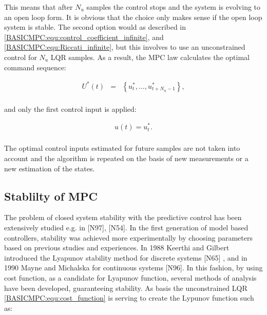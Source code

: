		This means that after $N_u$ samples the control stops and the system is evolving to an open loop form. It is obvious that the choice only makes sense if the open loop system is stable. The second option would as described in \ref{BASICMPC:equ:control_coefficient_infinite}, and \ref{BASICMPC:equ:Riccati_infinite}, but this involves to use an unconstrained control for $N_u$ LQR samples. As a result, the MPC law calculates the optimal command sequence:
		
		\begin{equation}
        \begin{array}{rcl}
				U^*(t)&=&\left\{u^*_t,\dots,u^*_{t+N_u-1}\right\},\\
        \end{array}
        \label{BASICMPC:equ:receiding_optimal_sequence}
    \end{equation}
		
		and only the first control input is applied:
		
		\begin{equation}
        \begin{array}{rcl}
				u(t)=u^*_t.\\
        \end{array}
        \label{BASICMPC:equ:receiding_optimal_first}
    \end{equation}
		
		The optimal control inputs estimated for future samples are not taken into account and the algorithm is
repeated on the basis of new measurements or a new estimation of the states.

\subsection{Stablilty of MPC}		
	
	The problem of closed system stability with the predictive control has been extensively studied e.g. in [N97], [N54]. In the first generation of model based controllers, stability was achieved more experimentally by choosing parameters based on previous studies and experiences. In 1988 Keerthi and Gilbert introduced the Lyapunov stability method for discrete systems [N65] , and in 1990 Mayne and Michalska for continuous systems [N96]. In this fashion, by using cost function, as a candidate for Lyapunov function, several methods of analysis have been developed, guaranteeing stability. 
	As basis the unconstrained LQR \ref{BASICMPC:equ:cost_function} is serving to create the Lypunov function such as:
	
